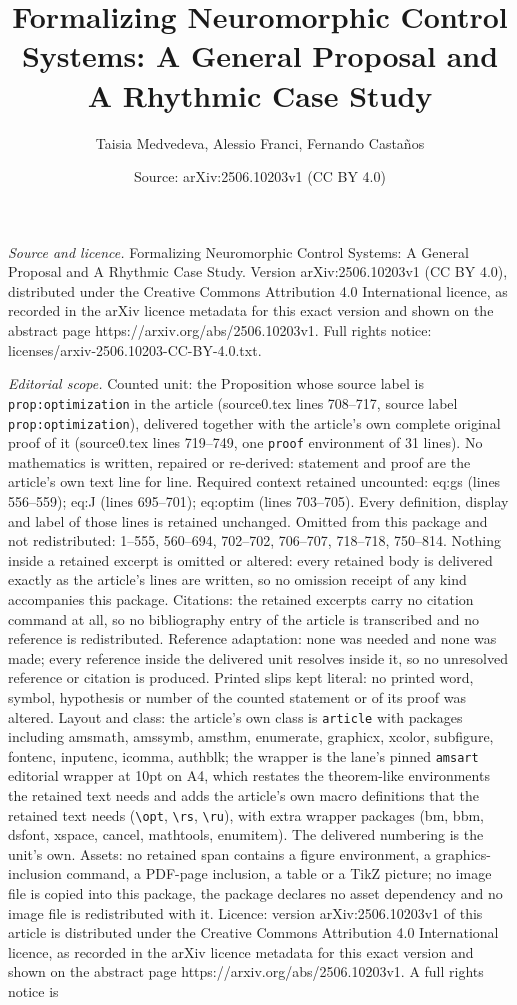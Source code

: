\documentclass[10pt,a4paper]{amsart}
\title[Formalizing Neuromorphic Control Systems: A General Proposal]{Formalizing Neuromorphic Control Systems: A General Proposal and A Rhythmic Case Study}
\author{Taisia Medvedeva, Alessio Franci, Fernando Casta\~nos}
\date{Source: arXiv:2506.10203v1 (CC BY 4.0)}
\begin{document}
\maketitle

\noindent\emph{Source and licence.} Formalizing Neuromorphic Control Systems: A General Proposal and A Rhythmic Case Study. Version arXiv:2506.10203v1 (CC BY 4.0), distributed under the Creative Commons Attribution 4.0 International licence, as recorded in the arXiv licence metadata for this exact version and shown on the abstract page https://arxiv.org/abs/2506.10203v1. Full rights notice: licenses/arxiv-2506.10203-CC-BY-4.0.txt.\par\smallskip

\noindent\textit{Editorial scope.} Counted unit: the Proposition whose source label is \texttt{prop:optimization} in the article (source0.tex lines 708--717, source label \texttt{prop:optimization}), delivered together with the article's own complete original proof of it (source0.tex lines 719--749, one \texttt{proof} environment of 31 lines). No mathematics is written, repaired or re-derived: statement and proof are the article's own text line for line. Required context retained uncounted: eq:gs (lines 556--559); eq:J (lines 695--701); eq:optim (lines 703--705). Every definition, display and label of those lines is retained unchanged. Omitted from this package and not redistributed: 1--555, 560--694, 702--702, 706--707, 718--718, 750--814. Nothing inside a retained excerpt is omitted or altered: every retained body is delivered exactly as the article's lines are written, so no omission receipt of any kind accompanies this package. Citations: the retained excerpts carry no citation command at all, so no bibliography entry of the article is transcribed and no reference is redistributed. Reference adaptation: none was needed and none was made; every reference inside the delivered unit resolves inside it, so no unresolved reference or citation is produced. Printed slips kept literal: no printed word, symbol, hypothesis or number of the counted statement or of its proof was altered. Layout and class: the article's own class is \texttt{article} with packages including amsmath, amssymb, amsthm, enumerate, graphicx, xcolor, subfigure, fontenc, inputenc, icomma, authblk; the wrapper is the lane's pinned \texttt{amsart} editorial wrapper at 10pt on A4, which restates the theorem-like environments the retained text needs and adds the article's own macro definitions that the retained text needs (\texttt{\textbackslash opt}, \texttt{\textbackslash rs}, \texttt{\textbackslash ru}), with extra wrapper packages (bm, bbm, dsfont, xspace, cancel, mathtools, enumitem). The delivered numbering is the unit's own. Assets: no retained span contains a figure environment, a graphics-inclusion command, a PDF-page inclusion, a table or a TikZ picture; no image file is copied into this package, the package declares no asset dependency and no image file is redistributed with it. Licence: version arXiv:2506.10203v1 of this article is distributed under the Creative Commons Attribution 4.0 International licence, as recorded in the arXiv licence metadata for this exact version and shown on the abstract page https://arxiv.org/abs/2506.10203v1. A full rights notice is 
\end{document}

